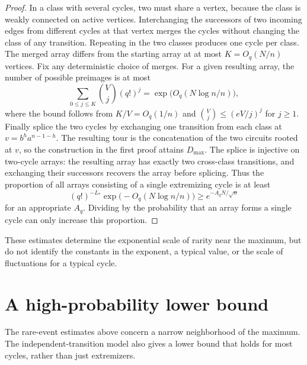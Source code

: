 \documentclass[11pt]{article}
\begin{document}
\begin{proof}
In a class with several cycles, two must share a vertex, because
the class is weakly connected on active vertices. Interchanging
the successors of two incoming edges from different cycles at
that vertex merges the cycles without changing the class of any
transition. Repeating in the two classes produces one cycle per
class. The merged array differs from the starting array at at
most \(K=O_q(N/n)\) vertices. Fix any deterministic choice of
merges. For a given resulting array, the number of possible
preimages is at most
\[
 \sum_{0\le j\le K}\binom{V}{j}(q!)^j
 =\exp\!\bigl(O_q(N\log n/n)\bigr),
\]
where the bound follows from \(K/V=O_q(1/n)\) and
\(\binom{V}{j}\le(eV/j)^j\) for \(j\ge1\).
Finally splice the two cycles by exchanging one transition from
each class at \(v=b^h a^{n-1-h}\). The resulting tour is the
concatenation of the two circuits rooted at \(v\), so the
construction in the first proof attains \(D_{\max}\).
The splice is injective on two-cycle arrays: the resulting
array has exactly two cross-class transitions, and exchanging
their successors recovers the array before splicing.
Thus the proportion of all arrays consisting of a single
extremizing cycle is at least
\[
 (q!)^{-L_*}\exp\!\bigl(-O_q(N\log n/n)\bigr)
 \ge e^{-A_q N/\sqrt n}
\]
for an appropriate \(A_q\). Dividing by the probability that an
array forms a single cycle can only increase this proportion.
\end{proof}

These estimates determine the exponential scale of rarity near the
maximum, but do not identify the constants in the exponent, a typical
value, or the scale of fluctuations for a typical cycle.


\section{A high-probability lower bound}
The rare-event estimates above concern a narrow neighborhood of
the maximum. The independent-transition model also gives a lower
bound that holds for most cycles, rather than just extremizers.
\end{document}
